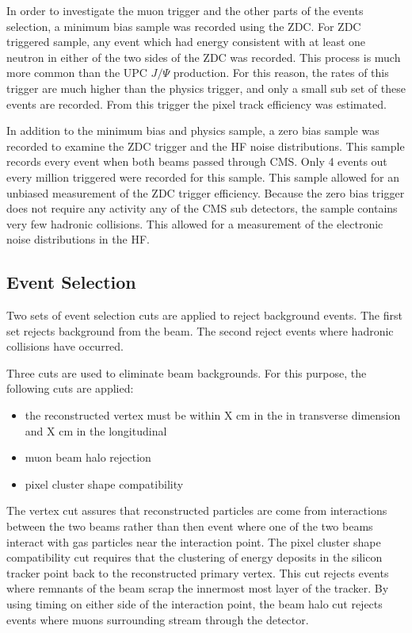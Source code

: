    In order to investigate the muon trigger and the other parts of the events 
      selection, a minimum bias sample was recorded using the ZDC. 
    For ZDC triggered sample, any event which had energy consistent with at 
      least one neutron in either of the two sides of the ZDC was recorded.
    This process is much more common than the UPC $J/\Psi$ production.
    For this reason, the rates of this trigger are much higher than the physics
      trigger, and only a small sub set of these events are recorded.
    From this trigger the pixel track efficiency was estimated. 

    In addition to the minimum bias and physics sample, a zero bias sample was 
      recorded to examine the ZDC trigger and the HF noise distributions. 
    This sample records every event when both beams passed through CMS. 
    Only 4 events out every million triggered were recorded for this sample. 
    This sample allowed for an unbiased measurement of the ZDC trigger 
      efficiency. 
    Because the zero bias trigger does not require any activity any of the
      CMS sub detectors, the sample contains very few hadronic collisions. 
    This allowed for a measurement of the electronic noise distributions in
      the HF. 

  \subsection{Event Selection}
    Two sets of event selection cuts are applied to reject background events. 
    The first set rejects background from the beam.
    The second reject events where hadronic collisions have occurred.
    
    Three cuts are used to eliminate beam backgrounds.
    For this purpose, the following cuts are applied:
    \begin{itemize}
	    \item the reconstructed vertex must be within X cm in the in 
		    transverse dimension and X cm in the longitudinal
	    \item muon beam halo rejection
	    \item pixel cluster shape compatibility
    \end{itemize}
    The vertex cut assures that reconstructed particles are come from 
      interactions between the two beams rather than then event where one of
      the two beams interact with gas particles near the interaction point. 
    The pixel cluster shape compatibility cut requires that the clustering
      of energy deposits in the silicon tracker point back to the reconstructed
      primary vertex. 
    This cut rejects events where remnants of the beam scrap the innermost 
      most layer of the tracker. 
    By using timing on either side of the interaction point, the beam halo cut
      rejects events where muons surrounding stream through the detector. 

